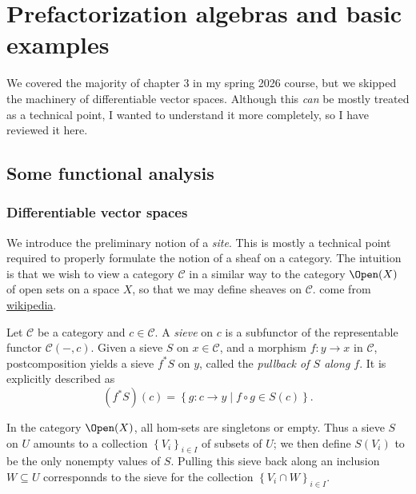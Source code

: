 \chapter{Prefactorization algebras and basic examples}

\setcounter{section}{4}

We covered the majority of chapter 3 in my spring 2026 course, but we skipped the machinery of differentiable vector spaces. Although this \emph{can} be mostly treated as a technical point, I wanted to understand it more completely, so I have reviewed it here.

\section{Some functional analysis}

\subsection{Differentiable vector spaces}

We introduce the preliminary notion of a \emph{site}. This is mostly a technical point required to properly formulate the notion of a sheaf on a category. The intuition is that we wish to view a category $\mathcal{C} $ in a similar way to the category $\Open(X) $ of open sets on a space $X$, so that we may define sheaves on $\mathcal{C} $.  come from \href{https://en.wikipedia.org/wiki/Grothendieck_topology}{wikipedia}. 

\begin{definition}\label{dfn:3-5-1}
	Let $\mathcal{C} $ be a category and $c\in \mathcal{C} $. A \emph{sieve} on $c$ is a subfunctor of the representable functor $\mathcal{C} (-,c)$. Given a sieve $S$ on $x\in \mathcal{C} $, and a morphism $f : y \to x$ in $\mathcal{C} $, postcomposition yields a sieve $f^*S$ on $y$, called the \emph{pullback of $S$ along $f$}. It is explicitly described as
	\[
		(f^*S)(c)= \left\{ g : c \to y \mid f\circ g\in S(c) \right\} 
	.\]
\end{definition}
In the category $\Open(X) $, all hom-sets are singletons or empty. Thus a sieve $S$ on $U$ amounts to a collection $\left\{ V_i \right\} _{i\in I} $ of subsets of $U$; we then define $S(V_i)$ to be the only nonempty values of $S$. Pulling this sieve back along an inclusion $W \subseteq U$ corresponnds to the sieve for the collection $\left\{ V_i \cap W \right\} _{i\in I} $.

